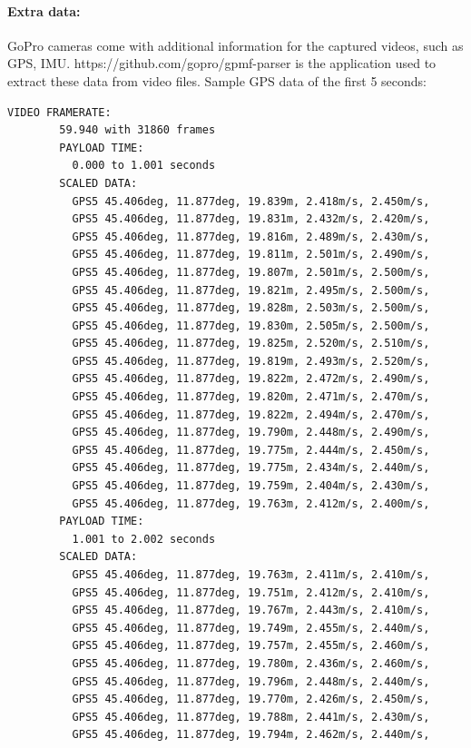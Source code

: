 \documentclass[11pt]{article}
\begin{document}
    \paragraph{Extra data:} GoPro cameras come with additional information for the captured videos, such as GPS, IMU.
    https://github.com/gopro/gpmf-parser is the application used to extract these data from video files. Sample GPS
    data of the first 5 seconds:

    \begin{lstlisting}[language=bash,caption={gpmf-parser output},label={lst:lstlisting}]
        VIDEO FRAMERATE:
        59.940 with 31860 frames
        PAYLOAD TIME:
          0.000 to 1.001 seconds
        SCALED DATA:
          GPS5 45.406deg, 11.877deg, 19.839m, 2.418m/s, 2.450m/s,
          GPS5 45.406deg, 11.877deg, 19.831m, 2.432m/s, 2.420m/s,
          GPS5 45.406deg, 11.877deg, 19.816m, 2.489m/s, 2.430m/s,
          GPS5 45.406deg, 11.877deg, 19.811m, 2.501m/s, 2.490m/s,
          GPS5 45.406deg, 11.877deg, 19.807m, 2.501m/s, 2.500m/s,
          GPS5 45.406deg, 11.877deg, 19.821m, 2.495m/s, 2.500m/s,
          GPS5 45.406deg, 11.877deg, 19.828m, 2.503m/s, 2.500m/s,
          GPS5 45.406deg, 11.877deg, 19.830m, 2.505m/s, 2.500m/s,
          GPS5 45.406deg, 11.877deg, 19.825m, 2.520m/s, 2.510m/s,
          GPS5 45.406deg, 11.877deg, 19.819m, 2.493m/s, 2.520m/s,
          GPS5 45.406deg, 11.877deg, 19.822m, 2.472m/s, 2.490m/s,
          GPS5 45.406deg, 11.877deg, 19.820m, 2.471m/s, 2.470m/s,
          GPS5 45.406deg, 11.877deg, 19.822m, 2.494m/s, 2.470m/s,
          GPS5 45.406deg, 11.877deg, 19.790m, 2.448m/s, 2.490m/s,
          GPS5 45.406deg, 11.877deg, 19.775m, 2.444m/s, 2.450m/s,
          GPS5 45.406deg, 11.877deg, 19.775m, 2.434m/s, 2.440m/s,
          GPS5 45.406deg, 11.877deg, 19.759m, 2.404m/s, 2.430m/s,
          GPS5 45.406deg, 11.877deg, 19.763m, 2.412m/s, 2.400m/s,
        PAYLOAD TIME:
          1.001 to 2.002 seconds
        SCALED DATA:
          GPS5 45.406deg, 11.877deg, 19.763m, 2.411m/s, 2.410m/s,
          GPS5 45.406deg, 11.877deg, 19.751m, 2.412m/s, 2.410m/s,
          GPS5 45.406deg, 11.877deg, 19.767m, 2.443m/s, 2.410m/s,
          GPS5 45.406deg, 11.877deg, 19.749m, 2.455m/s, 2.440m/s,
          GPS5 45.406deg, 11.877deg, 19.757m, 2.455m/s, 2.460m/s,
          GPS5 45.406deg, 11.877deg, 19.780m, 2.436m/s, 2.460m/s,
          GPS5 45.406deg, 11.877deg, 19.796m, 2.448m/s, 2.440m/s,
          GPS5 45.406deg, 11.877deg, 19.770m, 2.426m/s, 2.450m/s,
          GPS5 45.406deg, 11.877deg, 19.788m, 2.441m/s, 2.430m/s,
          GPS5 45.406deg, 11.877deg, 19.794m, 2.462m/s, 2.440m/s,

\end{lstlisting}
\end{document}

